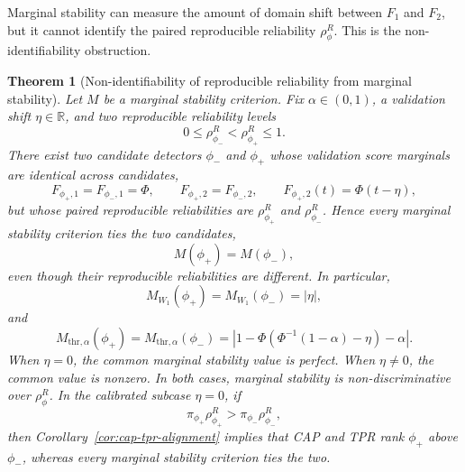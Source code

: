 \documentclass[11pt]{article}
\newtheorem{theorem}{Theorem}
\newcommand{\R}{\mathbb{R}}
\begin{document}
Marginal stability can measure the amount of domain shift between \(F_1\) and
\(F_2\), but it cannot identify the paired reproducible reliability
\(\rho_\phi^R\). This is the non-identifiability obstruction.

\begin{theorem}[Non-identifiability of reproducible reliability from marginal stability]
\label{thm:marginal-nonidentifiability}
Let \(M\) be a marginal stability criterion. Fix
\(\alpha\in(0,1)\), a validation shift \(\eta\in\R\), and two reproducible
reliability levels
\[
    0\le \rho_{\phi_-}^R<\rho_{\phi_+}^R\le 1.
\]
There exist two candidate detectors \(\phi_-\) and \(\phi_+\) whose validation
score marginals are identical across candidates,
\[
    F_{\phi_+,1}=F_{\phi_-,1}=\Phi,
    \qquad
    F_{\phi_+,2}=F_{\phi_-,2},
    \qquad
    F_{\phi_+,2}(t)=\Phi(t-\eta),
\]
but whose paired reproducible reliabilities are \(\rho_{\phi_+}^R\) and
\(\rho_{\phi_-}^R\). Hence every marginal stability criterion ties the two
candidates,
\[
    M(\phi_+)=M(\phi_-),
\]
even though their reproducible reliabilities are different. In particular,
\[
    M_{W_1}(\phi_+)=M_{W_1}(\phi_-)=|\eta|,
\]
and
\[
    M_{\mathrm{thr},\alpha}(\phi_+)
    =
    M_{\mathrm{thr},\alpha}(\phi_-)
    =
    \left|
        1-\Phi\!\left(\Phi^{-1}(1-\alpha)-\eta\right)-\alpha
    \right|.
\]
When \(\eta=0\), the common marginal stability value is perfect. When
\(\eta\ne0\), the common value is nonzero. In both cases, marginal stability is
non-discriminative over \(\rho_\phi^R\). In the calibrated subcase \(\eta=0\),
if
\[
    \pi_{\phi_+}\rho_{\phi_+}^R
    >
    \pi_{\phi_-}\rho_{\phi_-}^R,
\]
then Corollary~\ref{cor:cap-tpr-alignment} implies that CAP and TPR rank
\(\phi_+\) above \(\phi_-\), whereas every marginal stability criterion ties
the two.
\end{theorem}
\end{document}
